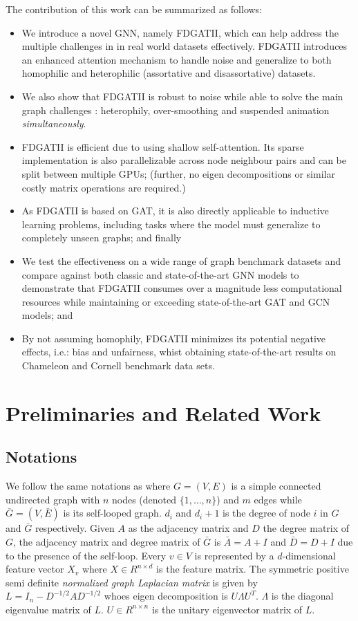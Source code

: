 \documentclass{article}
\begin{document}
The contribution of this work can be summarized as follows:
\begin{itemize}
\item We introduce a novel GNN, namely FDGATII, which can help address the multiple challenges in in real world datasets effectively. FDGATII introduces an enhanced attention mechanism to handle noise and generalize to both homophilic and heterophilic (assortative and disassortative) datasets. 
\item We also show that FDGATII is robust to noise while able to solve the main graph challenges : heterophily, over-smoothing and suspended animation  \textit{simultaneously}. 
\item FDGATII is efficient due to using shallow self-attention. Its sparse implementation is also parallelizable across node neighbour pairs and can be split between multiple GPUs; (further, no eigen decompositions or similar costly matrix operations are required.)
\item As FDGATII is based on GAT, it is also directly applicable to inductive learning problems, including tasks where the model must generalize to completely unseen graphs; and finally
\item We test the effectiveness on a wide range of graph benchmark datasets and compare against both classic and state-of-the-art GNN models to demonstrate that FDGATII consumes over a magnitude less computational resources while maintaining or exceeding state-of-the-art GAT and GCN models; and 
\item By not assuming homophily, FDGATII minimizes its potential negative effects, i.e.: bias and unfairness, whist obtaining state-of-the-art results on Chameleon and Cornell benchmark data sets.
\end{itemize}

\section{Preliminaries and Related Work} \label{Preliminaries}
\subsection{Notations} \label{Notations}
We follow the same notations as \citet{chen2020simple} where $G = (V,E)$ is a simple connected undirected graph with $n$ nodes (denoted $\{1,\ldots ,n\}$) and $m$ edges while $\bar{G} = (V,\bar{E})$ is its self-looped graph. $d_i$ and $d_i+1$ is the degree of node $i$ in $G$ and $\bar{G}$ respectively. Given $A$ as the adjacency matrix and $D$ the degree matrix of $G$, the adjacency matrix and degree matrix of $\bar{G}$ is $\bar{A} = A+I$ and $\bar{D} = D+I$ due to the presence of the self-loop. Every $v \in V$ is represented by a $d$-dimensional feature vector $X_v$ where $X \in R^{n \times d}$ is the  feature matrix. The symmetric positive semi definite \textit{normalized graph Laplacian matrix} is given by $L = I_{n}- D^{-1/2}AD^{-1/2}$ whoes eigen decomposition is $U\Lambda U^T$. $\Lambda$ is the diagonal eigenvalue matrix of $L$. $U \in R^{n \times n}$ is the unitary eigenvector matrix of $L$.
\end{document}
